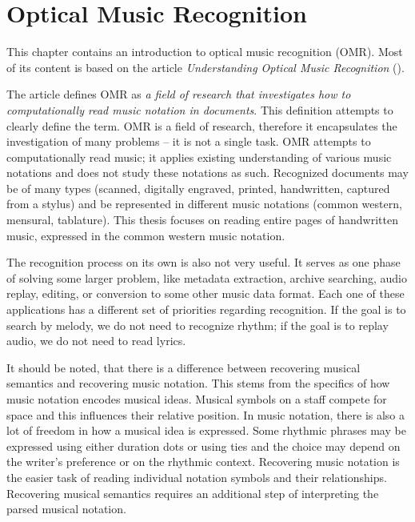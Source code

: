 \chapter{Optical Music Recognition}
\label{chap:OMR}

This chapter contains an introduction to optical music recognition (OMR). Most of its content is based on the article \emph{Understanding Optical Music Recognition} (\cite{UnderstandingOmr}).

The article defines OMR as \emph{a field of research that investigates how to computationally read music notation in documents}. This definition attempts to clearly define the term. OMR is a field of research, therefore it encapsulates the investigation of many problems -- it is not a single task. OMR attempts to computationally read music; it applies existing understanding of various music notations and does not study these notations as such. Recognized documents may be of many types (scanned, digitally engraved, printed, handwritten, captured from a stylus) and be represented in different music notations (common western, mensural, tablature). This thesis focuses on reading entire pages of handwritten music, expressed in the common western music notation.

The recognition process on its own is also not very useful. It serves as one phase of solving some larger problem, like metadata extraction, archive searching, audio replay, editing, or conversion to some other music data format. Each one of these applications has a different set of priorities regarding recognition. If the goal is to search by melody, we do not need to recognize rhythm; if the goal is to replay audio, we do not need to read lyrics.

It should be noted, that there is a difference between recovering musical semantics and recovering music notation. This stems from the specifics of how music notation encodes musical ideas. Musical symbols on a staff compete for space and this influences their relative position. In music notation, there is also a lot of freedom in how a musical idea is expressed. Some rhythmic phrases may be expressed using either duration dots or using ties and the choice may depend on the writer's preference or on the rhythmic context. Recovering music notation is the easier task of reading individual notation symbols and their relationships. Recovering musical semantics requires an additional step of interpreting the parsed musical notation.

